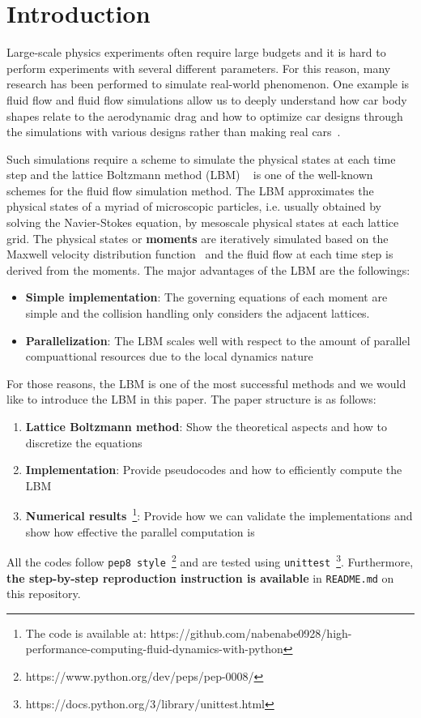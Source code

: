 \chapter{Introduction}
\vspace{-8mm}
Large-scale physics experiments often require large budgets
and it is hard to perform experiments with several different parameters.
For this reason, many research has been performed to simulate real-world 
phenomenon.
One example is fluid flow and
fluid flow simulations allow us to deeply understand
how car body shapes relate to the aerodynamic drag
and how to optimize car designs through the simulations with
various designs rather than making real cars~\cite{padagannavar2016automotive}.

Such simulations require a scheme to simulate the physical states
at each time step
and the lattice Boltzmann method (LBM) ~\cite{timm2016lattice}
is one of the well-known
schemes for the fluid flow simulation method.
The LBM approximates the physical states of a myriad of microscopic particles,
i.e. usually obtained by solving the Navier-Stokes equation,
by mesoscale physical states at each lattice grid.
The physical states or {\bf moments} are iteratively simulated based on
the Maxwell velocity distribution function~\cite{huang1963statistical} and
the fluid flow at each time step is derived from the moments.
The major advantages of the LBM are the followings:
\begin{itemize}
  \item {\bf Simple implementation}: The governing equations of each moment
  are simple and the collision handling only considers the adjacent lattices. 
  \item {\bf Parallelization}: The LBM scales well with respect to
  the amount of parallel compuattional resources due to
  the local dynamics nature~\cite{raabe2004overview}
\end{itemize}
For those reasons, the LBM is one of the most successful methods and
we would like to introduce the LBM in this paper.
The paper structure is as follows:
\begin{enumerate}
  \item {\bf Lattice Boltzmann method}: Show the theoretical aspects and
  how to discretize the equations
  \item {\bf Implementation}:
  Provide pseudocodes and how to efficiently compute
  the LBM
  \item {\bf Numerical results}~\footnote{
  The code is available at:
    https://github.com/nabenabe0928/high-performance-computing-fluid-dynamics-with-python
  }: Provide how we can validate the implementations
  and show how effective the parallel computation is
\end{enumerate}
All the codes follow {\tt pep8 style}~\footnote{https://www.python.org/dev/peps/pep-0008/} and 
are tested using
{\tt unittest}~\footnote{https://docs.python.org/3/library/unittest.html}.
Furthermore, {\bf the step-by-step reproduction instruction is available}
in {\tt README.md} on this repository.
